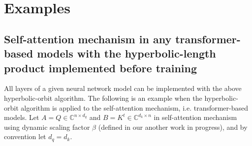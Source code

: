 \documentclass{article}
\theoremstyle{plain}
\theoremstyle{plain} %
\theoremstyle{definition}  %
\theoremstyle{remark}  %
\theoremstyle{plain}
\begin{document}
\section{Examples}
\subsection{Self-attention mechanism in any transformer-based models with the hyperbolic-length product implemented before training}
All layers of a given neural network model can be implemented with the above hyperbolic-orbit algorithm. The following is an example when the hyperbolic-orbit algorithm is applied to the self-attention mechanism, i.e. transformer-based models.
Let $A=Q\in \mathbb{C}^{n\times d_q}$ and $B=K^t\in \mathbb{C}^{d_k\times n}$ in self-attention mechanism\cite{vaswani2017attention} using dynamic scaling factor $\beta$ (defined in our another work in progress), and by convention let $d_q=d_k$.





\end{document}
